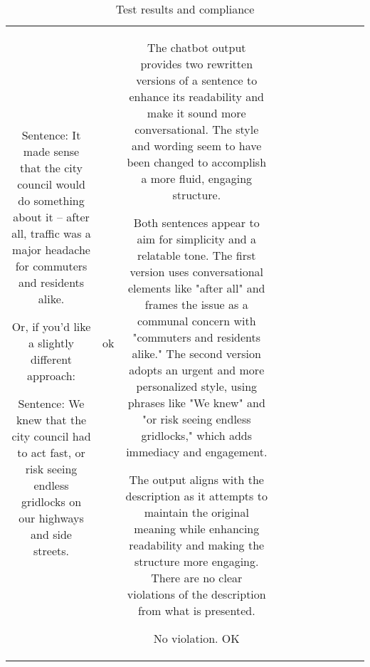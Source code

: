 \begin{table}[h!]
\begin{tabular}{|c|c|c|c|c|c|c|c|c|c|c|}
 Sentence: It made sense that the city council would do something about it – after all, traffic was a major headache for commuters and residents alike.

Or, if you'd like a slightly different approach:

 Sentence: We knew that the city council had to act fast, or risk seeing endless gridlocks on our highways and side streets. & ok & The chatbot output provides two rewritten versions of a sentence to enhance its readability and make it sound more conversational. The style and wording seem to have been changed to accomplish a more fluid, engaging structure. 

Both sentences appear to aim for simplicity and a relatable tone. The first version uses conversational elements like "after all" and frames the issue as a communal concern with "commuters and residents alike." The second version adopts an urgent and more personalized style, using phrases like "We knew" and "or risk seeing endless gridlocks," which adds immediacy and engagement.

The output aligns with the description as it attempts to maintain the original meaning while enhancing readability and making the structure more engaging. There are no clear violations of the description from what is presented.

No violation.
OK
  \end{tabular}
  \caption{Test results and compliance}
  
  \end{table}
  